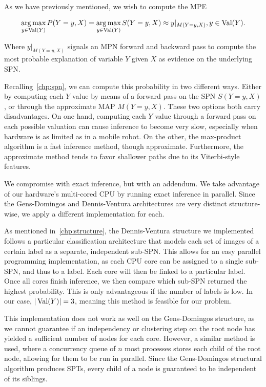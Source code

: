 As we have previously mentioned, we wish to compute the MPE

\begin{equation}
  \operatorname*{arg\,max}_{y\in\operatorname*{\text{Val}}(Y)} P(Y=y,X)=\operatorname*{arg\,max}_{y\in\operatorname*{\text{Val}}(Y)}S(Y=y,X)\approx y|_{M(Y=y,X)}, y\in\operatorname*{\text{Val}}(Y).
\end{equation}

Where $y|_{M(Y=y,X)}$ signals an MPN forward and backward pass to compute the most probable
explanation of variable $Y$ given $X$ as evidence on the underlying SPN.

Recalling~\autoref{chp:spn}, we can compute this probability in two different ways. Either
by computing each $Y$ value by means of a forward pass on the SPN $S(Y=y,X)$, or through the
approximate MAP $M(Y=y,X)$. These two options both carry disadvantages. On one hand, computing each
$Y$ value through a forward pass on each possible valuation can cause inference to become very
slow, especially when hardware is as limited as in a mobile robot. On the other, the max-product
algorithm is a fast inference method, though approximate. Furthermore, the approximate method tends
to favor shallower paths due to its Viterbi-style features.

We compromise with exact inference, but with an addendum. We take advantage of our hardware's
multi-cored CPU by running exact inference in parallel. Since the Gens-Domingos and Dennis-Ventura
architectures are very distinct structure-wise, we apply a different implementation for each.

As mentioned in~\autoref{chp:structure}, the Dennis-Ventura structure we implemented follows a
particular classification architecture that models each set of images of a certain label as a
separate, independent sub-SPN. This allows for an easy parallel programming implementation, as each
CPU core can be assigned to a single sub-SPN, and thus to a label. Each core will then be linked to
a particular label. Once all cores finish inference, we then compare which sub-SPN returned the
highest probability. This is only advantageous if the number of labels is low. In our case,
$|\operatorname*{\text{Val}}(Y)|=3$, meaning this method is feasible for our problem.

This implementation does not work as well on the Gens-Domingos structure, as we cannot guarantee if
an independency or clustering step on the root node has yielded a sufficient number of nodes for
each core. However, a similar method is used, where a concurrency queue of $n$ most processes
stores each child of the root node, allowing for them to be run in parallel. Since the
Gens-Domingos structural algorithm produces SPTs, every child of a node is guaranteed to be
independent of its siblings.

